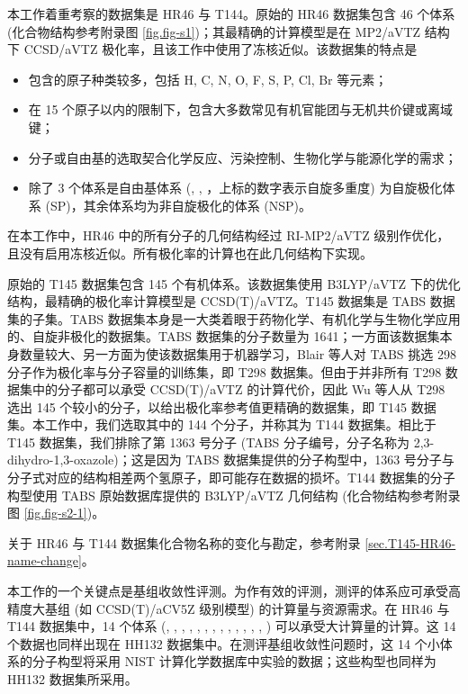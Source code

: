本工作着重考察的数据集是 HR46 与 T144。原始的 HR46 数据集\cite{Hickey-Rowley.JPCA.2014}包含 46 个体系 (化合物结构参考附录图 \ref{fig.fig-s1})；其最精确的计算模型是在 MP2/aVTZ 结构下 CCSD/aVTZ 极化率，且该工作中使用了冻核近似。该数据集的特点是
\begin{itemize}[nosep]
    \item 包含的原子种类较多，包括 H, C, N, O, F, S, P, Cl, Br 等元素；
    \item 在 15 个原子以内的限制下，包含大多数常见有机官能团与无机共价键或离域键；
    \item 分子或自由基的选取契合化学反应、污染控制、生物化学与能源化学的需求；
    \item 除了 3 个体系是自由基体系 (, , ，上标的数字表示自旋多重度) 为自旋极化体系 (SP)，其余体系均为非自旋极化的体系 (NSP)。
\end{itemize}
在本工作中，HR46 中的所有分子的几何结构经过 RI-MP2/aVTZ 级别作优化，且没有启用冻核近似。所有极化率的计算也在此几何结构下实现。

原始的 T145 数据集\cite{Wu-Thakkar.CPL.2015}包含 145 个有机体系。该数据集使用 B3LYP/aVTZ 下的优化结构，最精确的极化率计算模型是 CCSD(T)/aVTZ。T145 数据集是 TABS 数据集\cite{Blair-Thakkar.CTC.2014}的子集。TABS 数据集本身是一大类着眼于药物化学、有机化学与生物化学应用的、自旋非极化的数据集。TABS 数据集的分子数量为 1641；一方面该数据集本身数量较大、另一方面为使该数据集用于机器学习，Blair 等人对 TABS 挑选 298 分子作为极化率与分子容量的训练集，即 T298 数据集\cite{Blair-Thakkar.CPL.2014}。但由于并非所有 T298 数据集中的分子都可以承受 CCSD(T)/aVTZ 的计算代价，因此 Wu 等人从 T298 选出 145 个较小的分子，以给出极化率参考值更精确的数据集，即 T145 数据集\cite{Wu-Thakkar.CPL.2015}。本工作中，我们选取其中的 144 个分子，并称其为 T144 数据集。相比于 T145 数据集，我们排除了第 1363 号分子 (TABS 分子编号，分子名称为 2,3-dihydro-1,3-oxazole)；这是因为 TABS 数据集提供的分子构型中，1363 号分子与分子式对应的结构相差两个氢原子，即可能存在数据的损坏。T144 数据集的分子构型使用 TABS 原始数据库提供的 B3LYP/aVTZ 几何结构\cite{Blair-Thakkar.CTC.2014} (化合物结构参考附录图 \ref{fig.fig-s2-1})。

关于 HR46 与 T144 数据集化合物名称的变化与勘定，参考附录 \ref{sec.T145-HR46-name-change}。

本工作的一个关键点是基组收敛性评测。为作有效的评测，测评的体系应可承受高精度大基组 (如 CCSD(T)/aCV5Z 级别模型) 的计算量与资源需求。在 HR46 与 T144 数据集中，14 个体系 (, , , , , , , , , , , , , ) 可以承受大计算量的计算。这 14 个数据也同样出现在 HH132 数据集中。在测评基组收敛性问题时，这 14 个小体系的分子构型将采用 NIST 计算化学数据库中实验的数据\cite{NIST.CCCBDB}；这些构型也同样为 HH132 数据集所采用。

